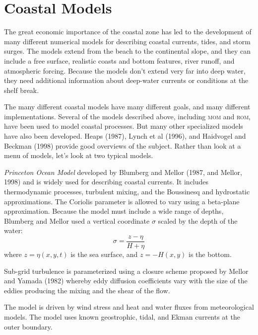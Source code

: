 \section{Coastal Models}
The great economic importance of the
coastal zone has led to the development of many different numerical
models for describing coastal currents, tides, and storm surges. The
models extend from the beach to the continental slope, and they can
include a free surface, realistic coasts and bottom features, river
runoff, and atmospheric forcing.  Because the models don't extend very
far into deep water, they need additional information about deep-water
currents or conditions at the shelf break.

The many different coastal models have many different goals, and many
different implementations. Several of the models described above,
including \textsc{mom} and \textsc{rom}, have been used to model
coastal processes. But many other specialized models have also been
developed. Heaps (1987), Lynch et al (1996), and Haidvogel and Beckman
(1998) provide good overviews of the subject. Rather than look at a
menu of models, let's look at two typical models.

\textit{Princeton Ocean Model} developed by Blumberg and Mellor (1987,
and Mellor, 1998) and is widely used for describing
coastal currents. It includes thermodynamic processes, turbulent
mixing, and the Boussinesq and
hydrostatic approximations. The
Coriolis parameter is allowed to vary
using a beta-plane approximation. Because the model must include a
wide range of depths, Blumberg and Mellor used a vertical coordinate
$\sigma$ scaled by the depth of the water:
\begin{equation}
\sigma = \frac{z-\eta}{H+\eta}
\end{equation}
where $z=\eta(x, y, t)$ is the sea surface, and $z=-H(x,y)$ is the bottom.

Sub-grid turbulence is parameterized using a
closure scheme proposed by Mellor and Yamada (1982) whereby eddy
diffusion coefficients vary with the size of the eddies producing the
mixing and
the shear of the flow.

The model is driven by wind stress and heat and water fluxes from meteorological models. The
model uses known geostrophic, tidal, and Ekman currents at the outer
boundary.

